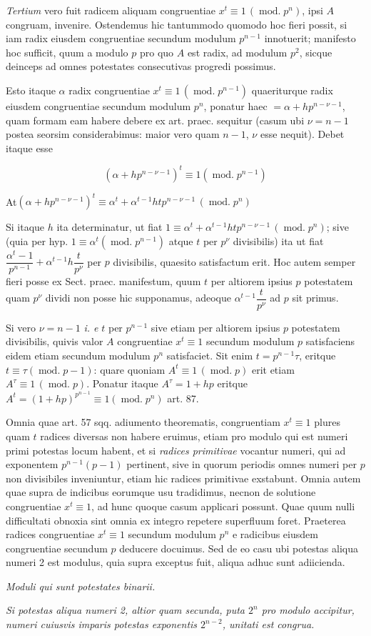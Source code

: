 
\emph{Tertium} vero fuit radicem aliquam congruentiae $x^t\equiv1\,(\operatorname{mod.}p^n)$, ipsi $A$ congruam, invenire. Ostendemus hic tantummodo quomodo hoc fieri possit, si iam radix eiusdem congruentiae secundum modulum $p^{n-1}$ innotuerit; manifesto hoc sufficit, quum a modulo $p$ pro quo $A$ est radix, ad modulum $p^2$, sicque deinceps ad omnes potestates consecutivas progredi possimus.

Esto itaque $\alpha$ radix congruentiae $x^t\equiv1\,(\operatorname{mod.}p^{n-1})$ quaeriturque radix eiusdem congruentiae secundum modulum $p^n$, ponatur haec $=\alpha+hp^{n-\nu-1}$, quam formam eam habere debere ex art. praec. sequitur (casum ubi $\nu=n-1$
postea seorsim considerabimus: maior vero quam $n-1$, $\nu$ esse nequit). Debet itaque esse

\[(\alpha+hp^{n-\nu-1})^t\equiv1(\operatorname{mod.}p^{n-1})\]

\noindent At\hfill $(\alpha+hp^{n-\nu-1})^t\equiv\alpha^t+\alpha^{t-1}htp^{n-\nu-1}\,(\operatorname{mod.}p^n)$\hfill\mbox{}

\noindent Si itaque $h$ ita determinatur, ut fiat $1\equiv\alpha^t+\alpha^{t-1}htp^{n-\nu-1}\,(\operatorname{mod.}p^n)$; sive (quia per hyp. $1\equiv\alpha^t(\operatorname{mod.}p^{n-1})$ atque $t$ per $p^{\nu}$ divisibilis) ita ut fiat $\dfrac{\alpha^t-1}{p^{n-1}}+\alpha^{t-1}h\dfrac{t}{p^{\nu}}$ per $p$ divisibilis, quaesito satisfactum erit. Hoc autem semper fieri posse ex Sect. praec. manifestum, quum $t$ per altiorem ipsius $p$ potestatem quam $p^{\nu}$ dividi non posse hic supponamus, adeoque $\alpha^{t-1}\dfrac{t}{p^{\nu}}$ ad $p$ sit primus.

Si vero $\nu=n-1$ \emph{i. e} $t$ per $p^{n-1}$ sive etiam per altiorem ipsius $p$ potestatem divisibilis, quivis valor $A$ congruentiae $x^t\equiv1$ secundum modulum $p$ satisfaciens eidem etiam secundum modulum $p^n$ satisfaciet. Sit enim $t=p^{n-1}\tau$, eritque $t\equiv\tau(\operatorname{mod.}p-1)$: quare quoniam $A^t\equiv1\,(\operatorname{mod.}p)$ erit etiam $A^{\tau}\equiv1\,(\operatorname{mod.}p)$. Ponatur itaque $A^{\tau}=1+hp$ eritque $A^t=(1+hp)^{p^{n-1}}\equiv1(\operatorname{mod.}p^n)$ art. 87.


Omnia quae art. 57 sqq. adiumento theorematis, congruentiam $x^t\equiv1$ plures quam $t$ radices diversas non habere eruimus, etiam pro modulo qui est numeri primi potestas locum habent, et si \emph{radices primitivae} vocantur numeri, qui ad exponentem $p^{n-1}(p-1)$ pertinent, sive in quorum periodis omnes numeri per $p$ non divisibiles inveniuntur, etiam hic radices primitivae exstabunt. Omnia autem quae supra de indicibus eorumque usu tradidimus, necnon de solutione congruentiae $x^t\equiv1$, ad hunc quoque casum applicari possunt. Quae quum nulli difficultati obnoxia sint omnia ex integro repetere superfluum foret. Praeterea radices congruentiae $x^t\equiv1$ secundum modulum $p^n$ e radicibus eiusdem congruentiae secundum $p$ deducere docuimus. Sed de eo casu ubi potestas aliqua numeri 2 est modulus, quia supra exceptus fuit, aliqua adhuc sunt adiicienda.

\begin{center}\emph{Moduli qui sunt potestates binarii.}\end{center}


\emph{Si potestas aliqua numeri 2, altior quam secunda, puta $2^n$ pro modulo accipitur, numeri cuiusvis imparis potestas exponentis $2^{n-2}$, unitati est congrua.}
